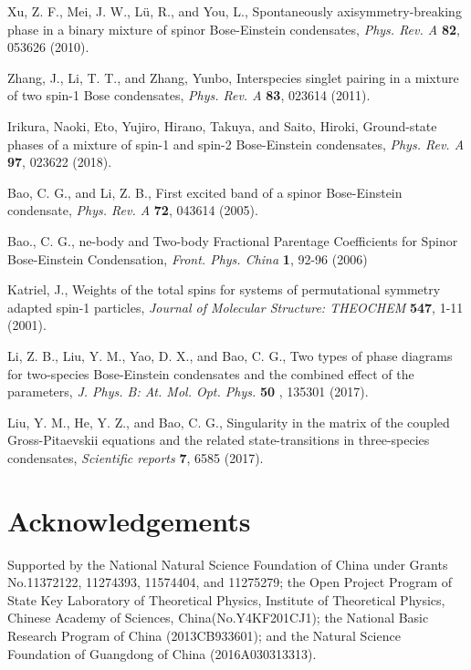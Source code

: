 \documentclass[10pt]{wlscirep}
\begin{document}
\begin{thebibliography}{99}
 Xu, Z. F., Mei, J. W., L\"{u}, R., and You, L.,
Spontaneously axisymmetry-breaking phase in a binary mixture of spinor
Bose-Einstein condensates, \textit{Phys. Rev. A} \textbf{82}, 053626 (2010).

 Zhang, J., Li, T. T., and Zhang, Yunbo, Interspecies singlet
pairing in a mixture of two spin-1 Bose condensates, \textit{Phys. Rev. A}
\textbf{83}, 023614 (2011).

 Irikura, Naoki, Eto, Yujiro, Hirano, Takuya, and Saito,
Hiroki, Ground-state phases of a mixture of spin-1 and spin-2 Bose-Einstein
condensates, \textit{Phys. Rev. A} \textbf{97}, 023622 (2018).

 Bao, C. G., and Li, Z. B., First excited band of a spinor
Bose-Einstein condensate, \textit{Phys. Rev. A} \textbf{72}, 043614 (2005).

 Bao., C. G., ne-body and Two-body Fractional Parentage
Coefficients for Spinor Bose-Einstein Condensation, \textit{Front. Phys.
China} \textbf{1}, 92-96 (2006)

 Katriel, J., Weights of the total spins for systems of
permutational symmetry adapted spin-1 particles, \textit{Journal of
Molecular Structure: THEOCHEM} \textbf{547}, 1-11 (2001).

 Li, Z. B., Liu, Y. M., Yao, D. X., and Bao, C. G., Two types
of phase diagrams for two-species Bose-Einstein condensates and the combined
effect of the parameters, \textit{J. Phys. B: At. Mol. Opt. Phys.} \textbf{50%
}, 135301 (2017).

 Liu, Y. M., He, Y. Z., and Bao, C. G., Singularity in the
matrix of the coupled Gross-Pitaevskii equations and the related
state-transitions in three-species condensates, \textit{Scientific reports}
\textbf{7}, 6585 (2017).
\end{thebibliography}



\section*{Acknowledgements}

Supported by the National Natural Science Foundation of China under Grants
No.11372122, 11274393, 11574404, and 11275279; the Open Project Program of
State Key Laboratory of Theoretical Physics, Institute of Theoretical
Physics, Chinese Academy of Sciences, China(No.Y4KF201CJ1); the National
Basic Research Program of China (2013CB933601); and the
Natural Science Foundation of Guangdong of China (2016A030313313).
\end{document}
